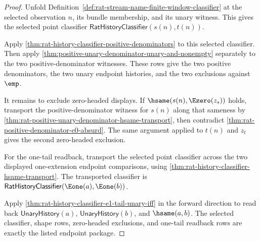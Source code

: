 \begin{proof}
Unfold Definition~\ref{def:rat-stream-name-finite-window-classifier} at the
selected observation $n$, its bundle membership, and its unary witness. This
gives the selected point classifier
$\mathsf{RatHistoryClassifier}(s(n),t(n))$.

Apply \autoref{thm:rat-history-classifier-positive-denominators} to this
selected classifier. Then apply
\autoref{thm:positive-unary-denominator-unary-and-nonempty} separately to the
two positive-denominator witnesses. These rows give the two positive
denominators, the two unary endpoint histories, and the two exclusions against
$\emp$.

It remains to exclude zero-headed displays. If
$\hsame(s(n),\Ezero(z_s))$ holds, transport the positive-denominator witness for
$s(n)$ along that sameness by
\autoref{thm:rat-positive-unary-denominator-hsame-transport}, then contradict
\autoref{thm:rat-positive-denominator-e0-absurd}. The same argument applied to
$t(n)$ and $z_t$ gives the second zero-headed exclusion.

For the one-tail readback, transport the selected point classifier across the
two displayed one-extension endpoint comparisons, using
\autoref{thm:rat-history-classifier-hsame-transport}. The transported
classifier is $\mathsf{RatHistoryClassifier}(\Eone(a),\Eone(b))$.

Apply \autoref{thm:rat-history-classifier-e1-tail-unary-iff} in the forward
direction to read back $\mathsf{UnaryHistory}(a)$,
$\mathsf{UnaryHistory}(b)$, and $\hsame(a,b)$. The selected classifier, shape
rows, zero-headed exclusions, and one-tail readback rows are exactly the listed
endpoint package.
\end{proof}

